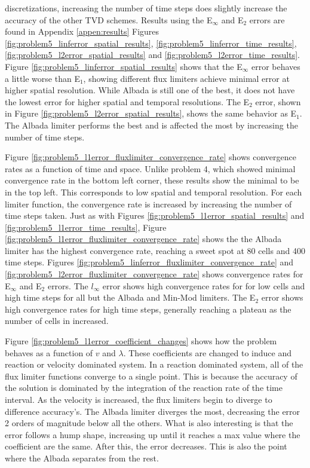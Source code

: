 \noindent discretizations, increasing the number of time steps does slightly increase the accuracy of the other TVD schemes. Results using the E${}_{\infty}$ and E${}_{2}$ errors are found in Appendix \ref{appen:results} Figures \ref{fig:problem5_linferror_spatial_results}, \ref{fig:problem5_linferror_time_results}, \ref{fig:problem5_l2error_spatial_results} and \ref{fig:problem5_l2error_time_results}. Figure \ref{fig:problem5_linferror_spatial_results} shows that the E${}_{\infty}$ error behaves a little worse than E${}_{1}$, showing different flux limiters achieve minimal error at higher spatial resolution. While Albada is still one of the best, it does not have the lowest error for higher spatial and temporal resolutions. The E${}_{2}$ error, shown in Figure \ref{fig:problem5_l2error_spatial_results}, shows the same behavior as E${}_{1}$. The Albada limiter performs the best and is affected the most by increasing the number of time steps.  

Figure \ref{fig:problem5_l1error_fluxlimiter_convergence_rate} shows convergence rates as a function of time and space. Unlike problem 4, which showed minimal convergence rate in the bottom left corner, these results show the minimal to be in the top left. This corresponds to low spatial and temporal resolution. For each limiter function, the convergence rate is increased by increasing the number of time steps taken. Just as with Figures \ref{fig:problem5_l1error_spatial_results} and \ref{fig:problem5_l1error_time_results}, Figure \ref{fig:problem5_l1error_fluxlimiter_convergence_rate} shows the the Albada limiter has the highest convergence rate, reaching a sweet spot at 80 cells and 400 time steps. Figures \ref{fig:problem5_linferror_fluxlimiter_convergence_rate} and \ref{fig:problem5_l2error_fluxlimiter_convergence_rate} shows convergence rates for E${}_{\infty}$ and E${}_{2}$ errors. The $l_{\infty}$ error shows high convergence rates for for low cells and high time steps for all but the Albada and Min-Mod limiters. The E${}_{2}$ error shows high convergence rates for high time steps, generally reaching a plateau as the number of cells in increased.

Figure \ref{fig:problem5_l1error_coefficient_changes} shows how the problem behaves as a function of $v$ and $\lambda$. These coefficients are changed to induce and reaction or velocity dominated system. In a reaction dominated system, all of the flux limiter functions converge to a single point. This is because the accuracy of the solution is dominated by the integration of the reaction rate of the time interval. As the velocity is increased, the flux limiters begin to diverge to difference accuracy's. The Albada limiter diverges the most, decreasing the error 2 orders of magnitude below all the others. What is also interesting is that the error follows a hump shape, increasing up until it reaches a max value where the coefficient are the same. After this, the error decreases. This is also the point where the Albada separates from the rest. 

